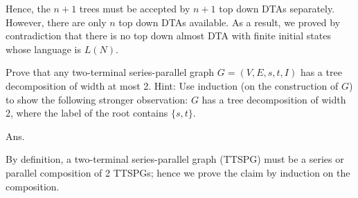 \documentclass[10pt]{homework}
\begin{document}
Hence, the \(n+1\) trees must be accepted by \(n+1\) top down DTAs separately.
However, there are only \(n\) top down DTAs available.
As a result, we proved by contradiction that there is no top down almost DTA
with finite initial states whose language is \(L(N)\).


\question
Prove that any two-terminal series-parallel graph \(G = (V, E, s, t, I)\) has a
tree decomposition of width at most 2.
Hint:
Use induction (on the construction of \(G\)) to show the following stronger
observation: \(G\) has a tree decomposition of width 2, where the label of the
root contains \(\{s, t\}\).

Ans.

By definition, a two-terminal series-parallel graph (TTSPG) must be a series or
parallel composition of 2 TTSPGs;
hence we prove the claim by induction on the composition.
\end{document}
